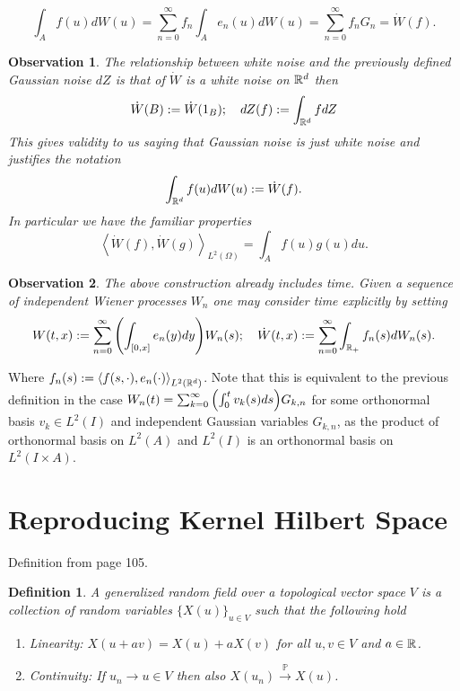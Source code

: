 \documentclass[12pt]{article}
\newtheorem{observation}{Observation}
\newtheorem{definition}{Definition}
\newcommand{\br}[1]{\left\langle#1\right\rangle}
\begin{document}
\begin{CJK*}{UTF8}{gbsn}
\begin{equation*}
		\int_{A}f(u) dW(u)=\sum_{n=0}^{\infty}  f_n \int_{A}e_n(u) dW(u)=\sum_{n=0}^{\infty}  f_n G_n=\dot{W}(f).
	\end{equation*}
	\begin{observation}
		The relationship between white noise and the previously defined Gaussian noise $dZ$ is that of $\dot{W}$ is a white noise on ${\mathbb R}^d$ then
		\begin{equation*}
			\dot{W}(B):=\dot{W}(1_B);\quad dZ(f):=\int_{{\mathbb R}^d} fdZ
		\end{equation*}
		This gives validity to us saying that Gaussian noise is just white noise and justifies the notation
		\begin{equation*}
			\int_{{\mathbb R}^d} f(u)dW(u):=\dot{W}(f).
		\end{equation*}
		In particular we have the familiar properties
		\begin{equation*}
			\br{\dot{W}(f),\dot{W}(g)}_{L^2(\Omega)}=\int_{A} f(u)g(u)du.
		\end{equation*}

	\end{observation}
	\begin{observation}
		The above construction already includes time. Given a sequence of independent Wiener processes $W_n$ one may consider time explicitly by setting
		\begin{align*}
			W(t,x)       :=\sum_{n=0}^{\infty} \qty(\int_{[0,x]} e_n(y) dy) W_n(s);\quad
			\dot{W}(t,x)  :=\sum_{n=0}^{\infty} \int_{{\mathbb R}_+}f_n(s) dW_n(s)
			.\end{align*}
	\end{observation}
	Where $f_n(s):=\br{f(s,\cdot ),e_n(\cdot )}_{L^2(\R^d)}$. Note that this is equivalent to the previous definition in the case $W_n(t)=\sum_{k=0}^{\infty}\qty(\int_{0}^tv_k(s)ds) G_{k,n}$  for some orthonormal basis $v_k \in L^2(I)$ and independent Gaussian variables $G_{k,n}$, as the product of orthonormal basis on $L^2(A)$ and $L^2(I)$ is an orthonormal basis on $L^2(I\times A)$.

	\section{Reproducing Kernel Hilbert Space}
	Definition from \cite{lototsky2017stochastic} page 105.
	\begin{definition}
		A generalized random field over a topological vector space $V$ is a collection of random variables  $\{X(u)\}_{u\in V}$ such that the following hold
		\begin{enumerate}
			\item \emph{Linearity}: $X(u+av)=X(u)+aX(v)$ for all  $u,v\in V$ and $a\in {\mathbb R}$.
			\item \emph{Continuity}: If $u_n\to u\in V$ then also $X(u_n)\xrightarrow{\mathbb{P}}X(u)$.
		\end{enumerate}
	\end{definition}

\end{CJK*}
\end{document}
